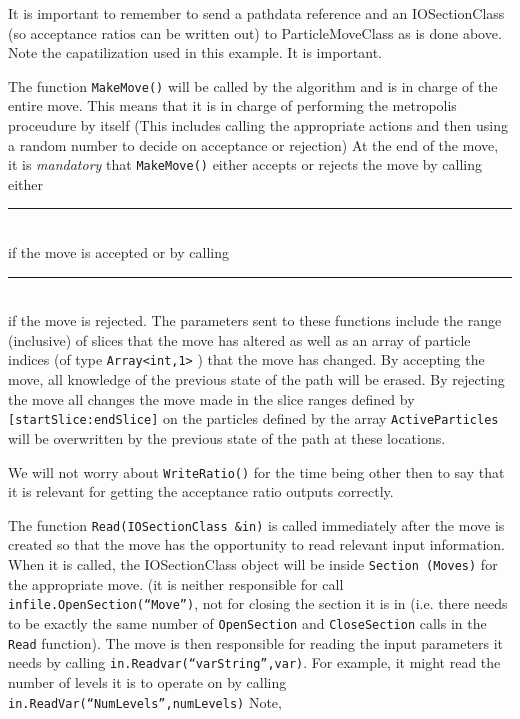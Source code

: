 \documentclass{book}
\begin{document}
It is important to remember to send a pathdata reference and an
  IOSectionClass (so acceptance ratios can be written out)  to ParticleMoveClass 
  as is done above. Note the 
  capatilization used in this example. It is important. 


The function \texttt{MakeMove()} will be called by the algorithm 
and is in charge of the entire move. This means that it is in charge
of performing the metropolis proceudure by itself (This includes calling
the appropriate actions and then using a random number to decide on 
acceptance or rejection)
At the end of the move, it is {\em mandatory} that \texttt{MakeMove()} 
either accepts or
rejects the move by calling either \\
\rule{0.6cm}{0cm}\\
if the move is accepted or by calling\\
\rule{0.6cm}{0cm}\\
 if the move is rejected.  
The parameters sent to these functions
include the range (inclusive) of slices that the move has altered as
well as an array of particle indices 
(of type  \texttt{Array<int,1>} ) that the move has changed.  
By accepting the move, all knowledge of the previous state of the path
will be erased. By rejecting the move all changes the move made in the
slice ranges defined by \texttt{[startSlice:endSlice]} on the particles defined
by the array \texttt{ActiveParticles} will be overwritten by the previous state
of the path at these locations.  


We will not worry about \texttt{WriteRatio()} for the time being other then to
say that it is relevant for getting the acceptance ratio outputs
correctly.

The function \texttt{Read(IOSectionClass \&in)} is called immediately after the
move is created so that the move has the opportunity to read relevant
input information.  When it is called, the IOSectionClass object
will be inside \texttt{Section (Moves)} for the appropriate move. 
(it is neither responsible for call \texttt{infile.OpenSection(``Move'')}, not
 for closing the section it is in (i.e. there needs to
be exactly the same number of \texttt{OpenSection} and  \texttt{CloseSection} calls in
the \texttt{Read} function).
 The move is then responsible for reading the input parameters it needs
by calling \texttt{in.Readvar(``varString'',var)}. For example, it might read the 
number of levels it is to operate on by calling 
\texttt{in.ReadVar(``NumLevels'',numLevels)} Note,
\end{document}
